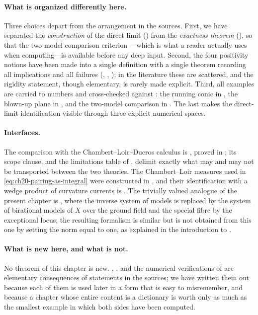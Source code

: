 \paragraph{What is organized differently here.}
Three choices depart from the arrangement in the sources.  First, we have
separated the \emph{construction} of the direct limit
() from the \emph{exactness
theorem} (), so that the two-model comparison
criterion ---which is what a reader
actually uses when computing---is available before any deep input.  Second,
the four positivity notions have been made into a single definition with a
single theorem recording all implications and all failures
(,
,
); in the literature these are
scattered, and the rigidity statement, though elementary, is rarely made
explicit.  Third, all examples are carried to numbers and cross-checked
against : the running conic in
, the blown-up plane in
, and the two-model
comparison in .  The last makes the
direct-limit identification visible through three explicit numerical
spaces.

\paragraph{Interfaces.}
The comparison with the Chambert--Loir--Ducros calculus is
, proved in
; its scope clause, and the limitations table of
, delimit exactly what may and may not be
transported between the two theories.  The Chambert--Loir measures used in
\eqref{eq:ch20-pairing-as-integral} were constructed in
, and their identification with a wedge product
of curvature currents is
.  The trivially valued analogue of the present
chapter is , where the inverse system of models is
replaced by the system of birational models of $X$ over the ground field
and the special fibre by the exceptional locus; the resulting formalism is
similar but is not obtained from this one by setting the norm equal to one,
as explained in the introduction to .

\paragraph{What is new here, and what is not.}
No theorem of this chapter is new.  ,
,  and the
numerical verifications of  are elementary
consequences of statements in the sources; we have written them out because
each of them is used later in a form that is easy to misremember, and
because a chapter whose entire content is a dictionary is worth only as much
as the smallest example in which both sides have been computed.
